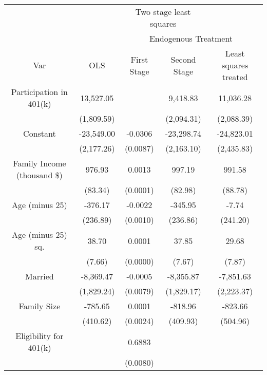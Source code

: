 
\begin{tabular}{ccccc}
\toprule
\multicolumn{2}{c}{ } & \multicolumn{2}{c}{Two stage least squares} \\
\cmidrule(l{3pt}r{3pt}){3-4}
\multicolumn{2}{c}{ } & \multicolumn{3}{c}{Endogenous Treatment} \\
\cmidrule(l{3pt}r{3pt}){3-5}
Var & OLS & First Stage & Second Stage & Least squares treated\\
\midrule
Participation in 401(k) & 13,527.05 &  & 9,418.83 & 11,036.28\\
 & (1,809.59) &  & (2,094.31) & (2,088.39)\\
Constant & -23,549.00 & -0.0306 & -23,298.74 & -24,823.01\\
 & (2,177.26) & (0.0087) & (2,163.10) & (2,435.83)\\
Family Income (thousand \$) & 976.93 & 0.0013 & 997.19 & 991.58\\
 & (83.34) & (0.0001) & (82.98) & (88.78)\\
Age (minus 25) & -376.17 & -0.0022 & -345.95 & -7.74\\
 & (236.89) & (0.0010) & (236.86) & (241.20)\\
Age (minus 25) sq. & 38.70 & 0.0001 & 37.85 & 29.68\\
 & (7.66) & (0.0000) & (7.67) & (7.87)\\
Married & -8,369.47 & -0.0005 & -8,355.87 & -7,851.63\\
 & (1,829.24) & (0.0079) & (1,829.17) & (2,223.37)\\
Family Size & -785.65 & 0.0001 & -818.96 & -823.66\\
 & (410.62) & (0.0024) & (409.93) & (504.96)\\
Eligibility for 401(k) &  & 0.6883 &  & \\
 &  & (0.0080) &  & \\
\bottomrule
\end{tabular}
